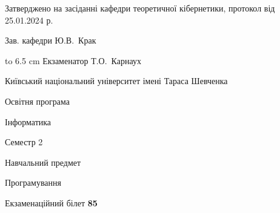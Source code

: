 \documentclass[12pt, ukrainian]{article}
\begin{document}
{\smallskip\smallskip \begin {scriptsize} Затверджено на засіданні кафедри теоретичної кібернетики, протокол   від   25.01.2024 р.\par\smallskip\smallskip\smallskip\smallskip
{\parbox {6.5 cm} {Зав. кафедри \dotfill Ю.В.~Крак}}\hspace {0.7cm} {\hbox to 6.5 cm { Екзаменатор \dotfill Т.О.~Карнаух}} \end{scriptsize}}
\newpage
{{\begin {scriptsize}\par
{ \center  Київський національний університет імені Тараса Шевченка \par}
{\parbox {5 cm}{Освітня програма \hfill}{\parbox {7 cm}{Інформатика\hfill}}\parbox {6 cm}{\hfill Семестр 2}}\par
{\parbox {5 cm} {Навчальний предмет \hfill}\parbox {7 cm}{Програмування \hfill}\parbox {6cm}{\hfill}\par}\vspace{-15pt} \end{scriptsize}}{\center Екзаменаційний білет \No \textbf { 85 }\par}}
\end{document}
